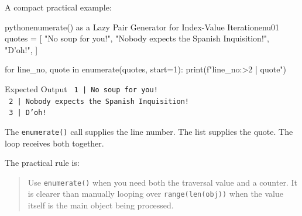 A compact practical example:

\begin{codebox}[]{python}{enumerate() as a Lazy Pair Generator for Index-Value Iteration}{enu01}
quotes = [
    "No soup for you!",
    "Nobody expects the Spanish Inquisition!",
    "D'oh!",
]

for line_no, quote in enumerate(quotes, start=1):
    print(f"{line_no:>2} | {quote}")
\end{codebox}


\begin{iobox}{Expected Output}
\texttt{ 1 | No soup for you!} \\
\texttt{ 2 | Nobody expects the Spanish Inquisition!} \\
\texttt{ 3 | D'oh!} \\
\end{iobox}


The \texttt{enumerate()} call supplies the line number. The list supplies the quote. The loop receives both together.

The practical rule is:

\begin{quote}
Use \texttt{enumerate()} when you need both the traversal value and a counter. It is clearer than manually looping over \texttt{range(len(obj))} when the value itself is the main object being processed.
\end{quote}